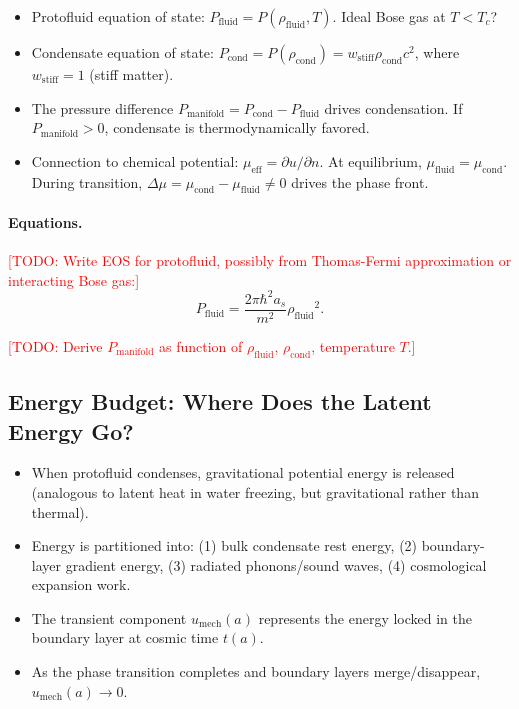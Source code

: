 \documentclass[11pt,a4paper]{article}
\newcommand{\umech}{\ensuremath{u_{\mathrm{mech}}}}
\newcommand{\rhofluid}{\ensuremath{\rho_{\mathrm{fluid}}}}
\newcommand{\rhocond}{\ensuremath{\rho_{\mathrm{cond}}}}
\newcommand{\Pmanifold}{\ensuremath{P_{\mathrm{manifold}}}}
\newcommand{\Pfluid}{\ensuremath{P_{\mathrm{fluid}}}}
\newcommand{\Pcond}{\ensuremath{P_{\mathrm{cond}}}}
\newcommand{\Tc}{\ensuremath{T_c}}
\newcommand{\mueff}{\ensuremath{\mu_{\mathrm{eff}}}}
\theoremstyle{definition}
\theoremstyle{remark}
\begin{document}
\begin{itemize}[leftmargin=*, itemsep=0.3em]
\item Protofluid equation of state: $\Pfluid = P(\rhofluid, T)$. Ideal Bose gas at $T < \Tc$?
\item Condensate equation of state: $\Pcond = P(\rhocond) = w_{\mathrm{stiff}} \rhocond c^2$, where $w_{\mathrm{stiff}} = 1$ (stiff matter).
\item The pressure difference $\Pmanifold = \Pcond - \Pfluid$ drives condensation. If $\Pmanifold > 0$, condensate is thermodynamically favored.
\item Connection to chemical potential: $\mueff = \partial u/\partial n$. At equilibrium, $\mu_{\mathrm{fluid}} = \mu_{\mathrm{cond}}$. During transition, $\Delta\mu = \mu_{\mathrm{cond}} - \mu_{\mathrm{fluid}} \neq 0$ drives the phase front.
\end{itemize}

\paragraph{Equations.}
\textcolor{red}{[TODO: Write EOS for protofluid, possibly from Thomas-Fermi approximation or interacting Bose gas:]}
\begin{equation}
\Pfluid = \frac{2\pi\hbar^2 a_s}{m^2} \rhofluid^2.
\label{eq:eos_fluid}
\end{equation}

\textcolor{red}{[TODO: Derive $\Pmanifold$ as function of $\rhofluid$, $\rhocond$, temperature $T$.]}

\subsection{Energy Budget: Where Does the Latent Energy Go?}
\label{sec:energy_budget}

\begin{itemize}[leftmargin=*, itemsep=0.3em]
\item When protofluid condenses, gravitational potential energy is released (analogous to latent heat in water freezing, but gravitational rather than thermal).
\item Energy is partitioned into: (1) bulk condensate rest energy, (2) boundary-layer gradient energy, (3) radiated phonons/sound waves, (4) cosmological expansion work.
\item The transient component $\umech(a)$ represents the energy locked in the boundary layer at cosmic time $t(a)$.
\item As the phase transition completes and boundary layers merge/disappear, $\umech(a) \to 0$.
\end{itemize}
\end{document}
